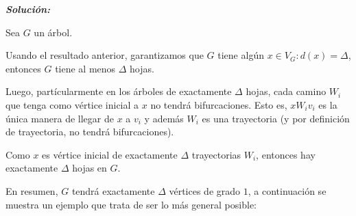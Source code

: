 \documentclass{article}
\begin{document}
\begin{enumerate}
\begin{enumerate}
          \textbf{\textit{Soluci\'on:}}

          Sea $G$ un \'arbol.

          Usando el resultado anterior, garantizamos que $G$ tiene alg\'un
          $x \in V_G : d(x) = \Delta$, entonces $G$ tiene al menos $\Delta$ hojas.

          Luego, part\'icularmente en los \'arboles de
          exactamente $\Delta$ hojas, cada camino $W_i$ que tenga como v\'ertice
          inicial a $x$ no tendr\'a bifurcaciones. Esto es, $x W_i v_i$ es la
          \'unica manera de llegar de $x$ a $v_i$ y adem\'as $W_i$ es una trayectoria
          (y por definici\'on de trayectoria, no tendr\'a bifurcaciones).

          Como $x$ es v\'ertice inicial de exactamente $\Delta$ trayectorias $W_i$,
          entonces hay exactamente $\Delta$ hojas en $G$.

          En resumen, $G$ tendr\'a exactamente $\Delta$ v\'ertices de grado $1$,
          a continuaci\'on se muestra un ejemplo que trata de ser lo m\'as general
          posible:

        \begin{figure}[ht!]
          \centering
\end{figure}
\end{enumerate}
\end{enumerate}
\end{document}
